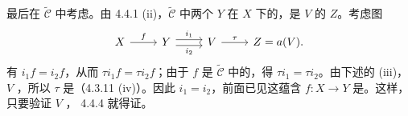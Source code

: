 最后在 $\widetilde{\mathcal C}$ 中考虑。由 4.4.1 (ii)，$\widetilde{\mathcal C}$ 中两个 $Y$ 在 $X$ 下的，是 $V$ 的 $Z$。考虑图
\[
\begin{tikzcd}
X\arrow[r,"f"]&Y\arrow[r,shift left=.6ex,"i_1"]\arrow[r,shift right=.6ex,"i_2"']&V\arrow[r,"\tau"]&Z=a(V).
\end{tikzcd}
\]
有 $i_1f=i_2f$，从而 $\tau i_1f=\tau i_2f$；由于 $f$ 是 $\widetilde{\mathcal C}$ 中的，得 $\tau i_1=\tau i_2$。由下述的 (iii)， $V$ ，所以 $\tau$ 是（4.3.11 (iv)）。因此 $i_1=i_2$，前面已见这蕴含
$f:X\to Y$ 是。这样，只要验证 $V$ ， 4.4.4 就得证。

